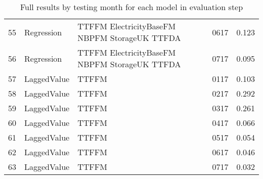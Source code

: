 \begin{table}[ht]
\begin{tabular}{rlllr}
  55 & Regression & TTFFM ElectricityBaseFM NBPFM StorageUK TTFDA & 0617 & 0.123 \\ 
  56 & Regression & TTFFM ElectricityBaseFM NBPFM StorageUK TTFDA & 0717 & 0.095 \\ 
  57 & LaggedValue & TTFFM  & 0117 & 0.103 \\ 
  58 & LaggedValue & TTFFM  & 0217 & 0.292 \\ 
  59 & LaggedValue & TTFFM  & 0317 & 0.261 \\ 
  60 & LaggedValue & TTFFM  & 0417 & 0.066 \\ 
  61 & LaggedValue & TTFFM  & 0517 & 0.054 \\ 
  62 & LaggedValue & TTFFM  & 0617 & 0.046 \\ 
  63 & LaggedValue & TTFFM  & 0717 & 0.032 \\ 
   \hline
\end{tabular}
\caption{Full results by testing month for each model in evaluation step} 
\label{tab:level.eval.short}
\end{table}
